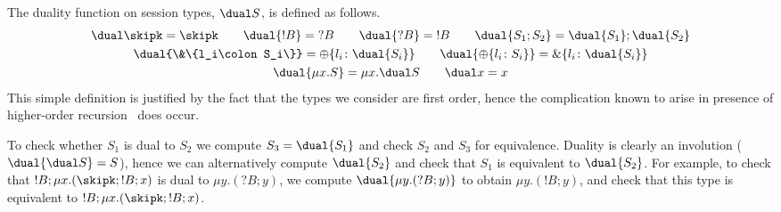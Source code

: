 
The duality function on session types, $\dual S$, is defined as
follows.
%
\begin{gather*}
  \dual\skipk = \skipk
  \qquad
  \dual{!B} = \;?B
  \qquad
  \dual{?B} = \;!B
  \qquad
  \dual{S_1;S_2} = \dual{S_1};\dual{S_2}
  \\
  \dual{\&\{l_i\colon S_i\}} = \oplus\{l_i\colon \dual{S_i}\}
  \qquad
  \dual{\oplus\{l_i\colon S_i\}} = \&\{l_i\colon \dual{S_i}\}
  \\
  \dual{\mu x.S} = \mu x.\dual S
  \qquad
  \dual x = x
\end{gather*}
%
This simple definition is justified by the fact that the types we
consider are first order, hence the complication known to arise
in presence of higher-order
recursion~\cite{bernardi.hennessy:using-contracts-model-session-types}
does occur.

To check whether $S_1$ is dual to $S_2$ we compute $S_3 = \dual{S_1}$
and check $S_2$ and $S_3$ for equivalence.
%
Duality is clearly an involution ($\dual{\dual S} = S$), hence we can
alternatively compute $\dual{S_2}$ and check that $S_1$ is equivalent
to $\dual{S_2}$.
%
For example, to check that $!B;\mu x.(\skipk;!B;x)$ is dual to
$\mu y.(?B;y)$, we compute $\dual{\mu y.(?B;y)}$ to obtain
$\mu y.(!B;y)$, and check that this type is equivalent to
$!B;\mu x.(\skipk;!B;x)$.


